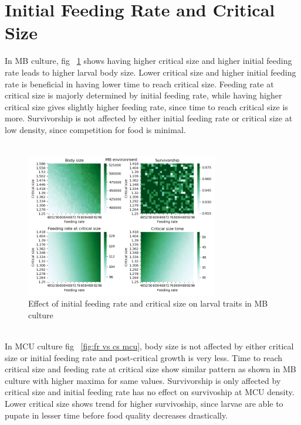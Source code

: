 \section{Initial Feeding Rate and Critical Size}
In MB culture, fig ~\ref{fig:fr vs cs mb} shows having higher critical size and higher initial feeding rate leads to higher larval body size. Lower critical size and higher initial feeding rate is beneficial in having lower time to reach critical size. Feeding rate at critical size is majorly determined by initial feeding rate, while having higher critical size gives slightly higher feeding rate, since time to reach critical size is more. Survivorship is not affected by either initial feeding rate or critical size at low density, since competition for food is minimal. \\ \\
\begin{figure}
  \centering
  \includegraphics[width=0.75\textwidth]{C3/Figs/Critical_size_vs_Feeding_rate_MB}
  \caption{Effect of initial feeding rate and critical size on larval traits in MB culture}
  \label{fig:fr vs cs mb}
\end{figure}\\
In MCU culture fig ~\ref{fig:fr vs cs mcu}, body size is not affected by either critical size or initial feeding rate and post-critical growth is very less. Time to reach critical size and feeding rate at critical size show similar pattern as shown in MB culture with higher maxima for same values. Survivorship is only affected by critical size and initial feeding rate has no effect on survivoship at MCU density. Lower critical size shows trend for higher survivoship, since larvae are able to pupate in lesser time before food quality decreases drastically.\\ \\
